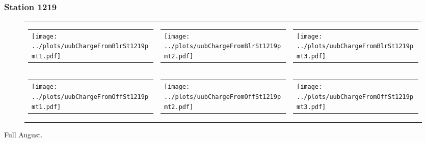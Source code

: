 \documentclass[aspectratio=169]{beamer}
\begin{document}
\begin{frame} 
  \frametitle{Station 1219}
 
  \begin{figure}
    \centering
    \begin{tabularx}{\textwidth}{LCR}
      \begin{tabular}{l}
        \texttt{[image: ../plots/uubChargeFromBlrSt1219pmt1.pdf]}
      \end{tabular}
      &
      \begin{tabular}{l}
        \texttt{[image: ../plots/uubChargeFromBlrSt1219pmt2.pdf]}
      \end{tabular}
      &
      \begin{tabular}{l}
        \texttt{[image: ../plots/uubChargeFromBlrSt1219pmt3.pdf]}
      \end{tabular}
      \\
      \begin{tabular}{l}
        \texttt{[image: ../plots/uubChargeFromOffSt1219pmt1.pdf]}
      \end{tabular}
      &
      \begin{tabular}{l}
        \texttt{[image: ../plots/uubChargeFromOffSt1219pmt2.pdf]}
      \end{tabular}
      &
      \begin{tabular}{l}
        \texttt{[image: ../plots/uubChargeFromOffSt1219pmt3.pdf]}
      \end{tabular}
    \end{tabularx}
  \end{figure}
  Full August. 
\end{frame}
\end{document}
